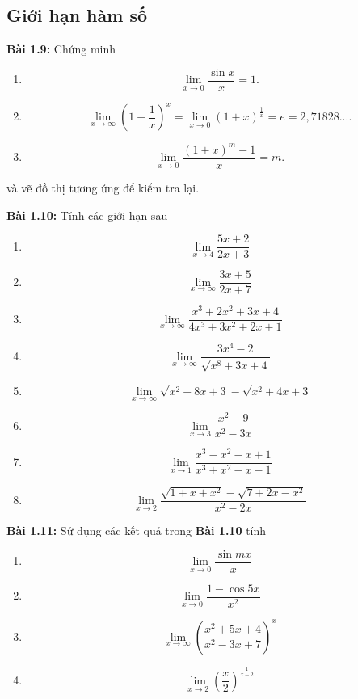 \subsection*{Giới hạn hàm số}
\textbf{Bài 1.9:} Chứng minh
\begin{enumerate}[label=(\alph*)]
    \item \[\lim_{x\rightarrow 0}\frac{\sin x}{x}=1.\]
    \item \[\lim_{x\rightarrow\infty}\left(1+\frac{1}{x}\right)^x =\lim_{x\rightarrow 0}\left(1+x\right)^{\frac{1}{x}}= e=2,71828... .\]
    \item \[\lim_{x\rightarrow 0}\frac{(1+x)^m -1}{x}=m.\]
\end{enumerate}
và vẽ đồ thị tương ứng để kiểm tra lại.
\vspace{5pt}

\textbf{Bài 1.10:} Tính các giới hạn sau 
\begin{enumerate}[label=(\alph*)]
    \item \[\lim_{x\rightarrow 4}\frac{5x+2}{2x+3}\]
    \item \[\lim_{x\rightarrow \infty}\frac{3x+5}{2x+7} \]
    \item \[\lim_{x\rightarrow\infty}\frac{x^3 +2x^2 +3x+4}{4x^3 +3x^2 +2x+1}\]
    \item \[\lim_{x\rightarrow\infty}\frac{3x^4 -2}{\sqrt{x^8+3x+4}}\]
    \item \[\lim_{x\rightarrow\infty}\sqrt{x^2 +8x+3}-\sqrt{x^2+4x+3}\]
    \item \[\lim_{x\rightarrow 3}\frac{x^2 -9}{x^2-3x}\]
    \item \[\lim_{x\rightarrow 1}\frac{x^3 -x^2 -x+1}{x^3+x^2 -x-1}\]
    \item \[\lim_{x\rightarrow 2}\frac{\sqrt{1+x+x^2}-\sqrt{7+2x-x^2}}{x^2-2x}\]
\end{enumerate}
\vspace{5pt}

\textbf{Bài 1.11:} Sử dụng các kết quả trong \textbf{Bài 1.10} tính
\begin{enumerate}[label=(\alph*)]
    \item \[\lim_{x\rightarrow 0}\frac{\sin mx}{x}\]
    \item \[\lim_{x\rightarrow 0}\frac{1-\cos 5x}{x^2}\]
    \item \[\lim_{x\rightarrow\infty}\left(\frac{x^2+5x+4}{x^2-3x+7}\right)^x\]
    \item \[\lim_{x\rightarrow 2}\left(\frac{x}{2}\right)^{\frac{1}{x-2}}\]
\end{enumerate}

